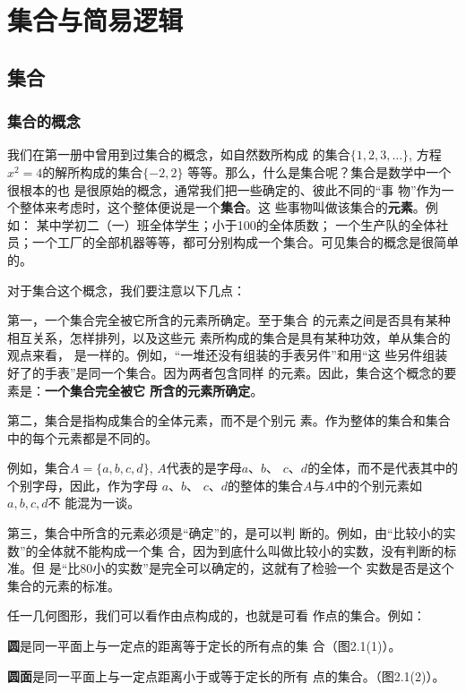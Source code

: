 \chapter{集合与简易逻辑}

\section{集合}
\subsection{集合的概念}
我们在第一册中曾用到过集合的概念，如自然数所构成
的集合$\{1,2,3,\ldots\}$, 方程$x^2=4$的解所构成的集合$\{-2,2\}$
等等。那么，什么是集合呢？集合是数学中一个很根本的也
是很原始的概念，通常我们把一些确定的、彼此不同的“事
物”作为一个整体来考虑时，这个整体便说是一个\textbf{集合}。这
些事物叫做该集合的\textbf{元素}。例如：
某中学初二（一）班全体学生；小于100的全体质数；
一个生产队的全体社员；一个工厂的全部机器等等，都可分别构成一个集合。可见集合的概念是很简单
的。

对于集合这个概念，我们要注意以下几点：

第一，一个集合完全被它所含的元素所确定。至于集合
的元素之间是否具有某种相互关系，怎样排列，以及这些元
素所构成的集合是具有某种功效，单从集合的观点来看，
是一样的。例如，“一堆还没有组装的手表另件”和用“这
些另件组装好了的手表”是同一个集合。因为两者包含同样
的元素。因此，集合这个概念的要素是：\textbf{一个集合完全被它
	所含的元素所确定}。

第二，集合是指构成集合的全体元素，而不是个别元
素。作为整体的集合和集合中的每个元素都是不同的。

例如，集合$A=\{a,b,c,d\}$, $A$代表的是字母$a$、$b$、
$c$、$d$的全体，而不是代表其中的个别字母，因此，作为字母
$a$、$b$、
$c$、$d$的整体的集合$A$与$A$中的个别元素如$a,b,c,d$不
能混为一谈。

第三，集合中所含的元素必须是“确定”的，是可以判
断的。例如，由“比较小的实数”的全体就不能构成一个集
合，因为到底什么叫做比较小的实数，没有判断的标准。但
是“比80小的实数”是完全可以确定的，这就有了检验一个
实数是否是这个集合的元素的标准。

任一几何图形，我们可以看作由点构成的，也就是可看
作点的集合。例如：

\textbf{圆}是同一平面上与一定点的距离等于定长的所有点的集
合（图2.1(1)）。

\textbf{圆面}是同一平面上与一定点距离小于或等于定长的所有
点的集合。（图2.1(2)）。

